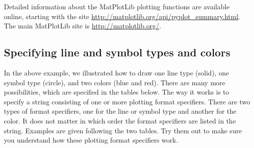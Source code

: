 \documentclass[letterpaper,10pt,english]{sphinxmanual}
\begin{document}
Detailed information about the MatPlotLib plotting functions are available online, starting with the site \href{http://matplotlib.org/api/pyplot\_summary.html}{http://matplotlib.org/api/pyplot\_summary.html}.  The main MatPlotLib site is \href{http://matplotlib.org/}{http://matplotlib.org/}.


\subsection{Specifying line and symbol types and colors}
\label{chap5/chap5_plot:specifying-line-and-symbol-types-and-colors}
In the above example, we illustrated how to draw one line type (solid), one symbol type (circle), and two colors (blue and red).  There are many more possibilities, which are specified in the tables below.  The way it works is to specify a string consisting of one or more plotting format specifiers.  There are two types of format specifiers, one for the line or symbol type and another for the color.  It does not matter in which order the  format specifiers are listed in the string.  Examples are given following the two tables.  Try them out to make sure you understand how these plotting format specifiers work.
\end{document}
